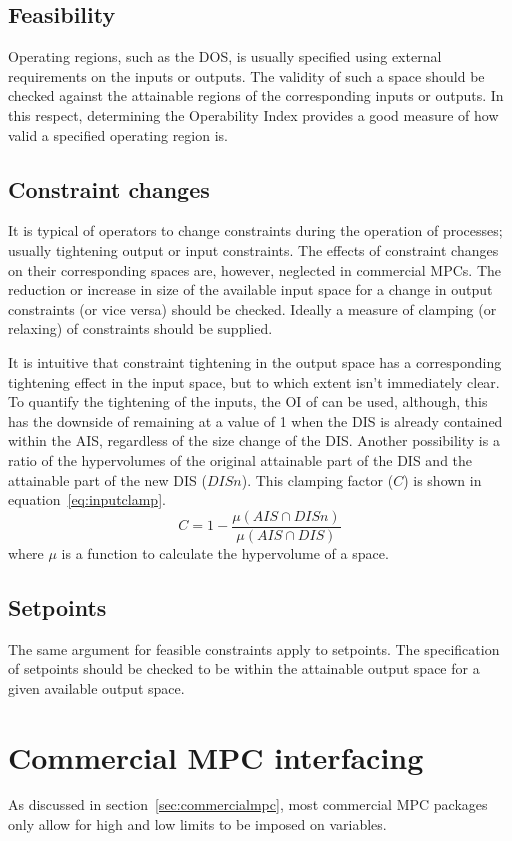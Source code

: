 \subsection{Feasibility}
Operating regions, such as the DOS, is usually specified using external requirements on the inputs or outputs.
The validity of such a space should be checked against the attainable regions of the corresponding inputs or outputs.
In this respect, determining the Operability Index provides a good measure of how valid a specified operating region is.

\subsection{Constraint changes}
It is typical of operators to change constraints during the operation of processes; usually tightening output or input constraints.
The effects of constraint changes on their corresponding spaces are, however, neglected in commercial MPCs.
The reduction or increase in size of the available input space for a change in output constraints (or vice versa) should be checked.
Ideally a measure of clamping (or relaxing) of constraints should be supplied.

It is intuitive that constraint tightening in the output space has a corresponding tightening effect in the input space, but to which extent isn't immediately clear.
To quantify the tightening of the inputs, the OI of \citet{vinsonphd} can be used, although, this has the downside of remaining at a value of 1 when the DIS is already contained within the AIS, regardless of the size change of the DIS.
Another possibility is a ratio of the hypervolumes of the original attainable part of the DIS and the attainable part of the new DIS ($DISn$).
This clamping factor ($C$) is shown in equation~\ref{eq:inputclamp}.
\begin{equation}
  \label{eq:inputclamp}
  C = 1-\frac{\mu(AIS \cap DISn)}{\mu(AIS \cap DIS)}
\end{equation}
where $\mu$ is a function to calculate the hypervolume of a space.

\subsection{Setpoints}
The same argument for feasible constraints apply to setpoints.
The specification of setpoints should be checked to be within the attainable output space for a given available output space.

\section{Commercial MPC interfacing}
As discussed in section~\ref{sec:commercialmpc}, most commercial MPC packages only allow for high and low limits to be imposed on variables.

